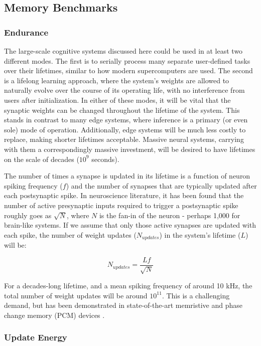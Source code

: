 \documentclass{article}
\begin{document}
\subsection{Memory Benchmarks}
\subsubsection{Endurance}
The large-scale cognitive systems discussed here could be used in at least two different modes. The first is to serially process many separate user-defined tasks over their lifetimes, similar to how modern supercomputers are used. The second is a lifelong learning approach, where the system's weights are allowed to naturally evolve over the course of its operating life, with no interference from users after initialization. In either of these modes, it will be vital that the synaptic weights can be changed throughout the lifetime of the system. This stands in contrast to many edge systems, where inference is a primary (or even sole) mode of operation. Additionally, edge systems will be much less costly to replace, making shorter lifetimes acceptable. Massive neural systems, carrying with them a correspondingly massive investment, will be desired to have lifetimes on the scale of decades ($10^9$ seconds).

The number of times a synapse is updated in its lifetime is a function of neuron spiking frequency ($f$) and the number of synapses that are typically updated after each postsynaptic spike. In neuroscience literature, it has been found that the number of active presynaptic inputs required to trigger a postsynaptic spike roughly goes as $\sqrt{N}$, where $N$ is the fan-in of the neuron - perhaps 1,000 for brain-like systems. If we assume that only those active synapses are updated with each spike, the number of weight updates ($N_{updates}$) in the system's lifetime ($L$) will be:

\begin{equation}
    N_{updates} = \frac{Lf}{\sqrt{N}}
\end{equation}

For a decades-long lifetime, and a mean spiking frequency of around 10 kHz, the total number of weight updates will be around $10^{11}$. This is a challenging demand, but has been demonstrated in state-of-the-art memristive and phase change memory (PCM) devices \cite{zhao2020reliability}.

\subsubsection{Update Energy}
\end{document}
